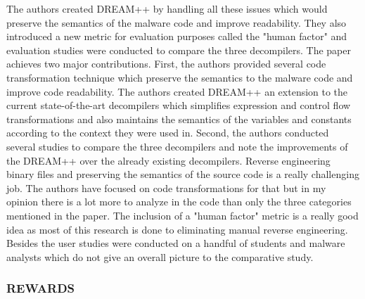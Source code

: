 \documentclass[11pt]{article}
\begin{document}
		The authors created DREAM++ by handling all these issues which would preserve the semantics of the malware code and improve readability. They also introduced a new metric for evaluation purposes called the "human factor" and evaluation studies were conducted to compare the three decompilers. The paper achieves two major contributions. First, the authors provided several code transformation technique which preserve the semantics to the malware code and improve code readability. The authors created DREAM++ an extension to the current state-of-the-art decompilers which simplifies expression and control flow transformations and also maintains the semantics of the variables and constants according to the context they were used in. Second, the authors conducted several studies to compare the three decompilers and note the improvements of the DREAM++ over the already existing decompilers. Reverse engineering binary files and preserving the semantics of the source code is a really challenging job. The authors have focused on code transformations for that but in my opinion there is a lot more to analyze in the code than only the three categories mentioned in the paper. The inclusion of a "human factor" metric is a really good idea as most of this research is done to eliminating manual reverse engineering. Besides the user studies were conducted on a handful of students and malware analysts which do not give an overall picture to the comparative study.
		
		\subsubsection{REWARDS}
		
\end{document}
